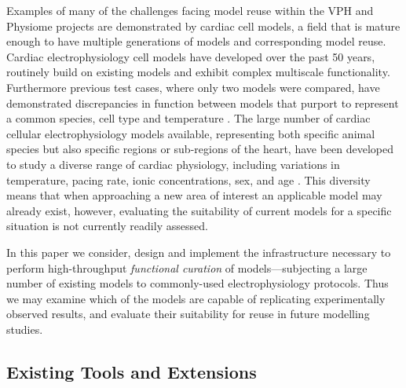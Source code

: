 \documentclass[preprint,authoryear,12pt]{elsarticle}
\begin{document}
Examples of many of the challenges facing model reuse within the VPH and Physiome projects are demonstrated by cardiac cell models, a field that is mature enough to have multiple generations of models and corresponding model reuse.
Cardiac electrophysiology cell models have developed over the past 50 years, routinely build on existing models and exhibit complex multiscale functionality.
Furthermore previous test cases, where only two models were compared, have demonstrated discrepancies in function between models that purport to represent a common species, cell type and temperature \citep{Niederer*.09:meta,cherry2007tale}.
The large number of cardiac cellular electrophysiology models available, representing both specific animal species but also specific regions or sub-regions of the heart, have been developed to study a diverse range of cardiac physiology, including variations in temperature, pacing rate, ionic concentrations, sex, and age \citep{Clayton*.10:Models}.
This diversity means that when approaching a new area of interest an applicable
model may already exist, however, evaluating the suitability of current models
for a specific situation is not currently readily assessed.


In this paper we consider, design and implement the infrastructure necessary to perform high-throughput \emph{functional curation} of models---subjecting a large number of existing models to commonly-used electrophysiology protocols.
Thus we may examine which of the models are capable of replicating experimentally observed results, and evaluate their suitability for reuse in future modelling studies.



\subsection{Existing Tools and Extensions}
\label{sec:intro-existing-work}
\end{document}
